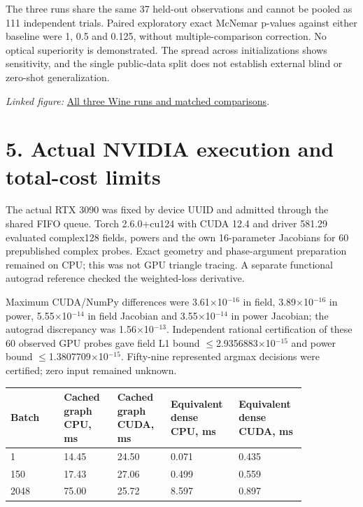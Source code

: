 \documentclass[11pt]{article}
\begin{document}
The three runs share the same 37 held-out observations and cannot be pooled as 111 independent trials. Paired exploratory exact McNemar p-values against either baseline were 1, 0.5 and 0.125, without multiple-comparison correction. No optical superiority is demonstrated. The spread across initializations shows sensitivity, and the single public-data split does not establish external blind or zero-shot generalization.

\noindent\textit{Linked figure: }\href{https://github.com/Agnuxo1/Neuro3D/blob/a6d0fbec5011bdc76abad71edac86519016348f4/Docs/assets/wine-geometry-and-baselines-2026-10-09.png}{All three Wine runs and matched comparisons}.

\section*{5. Actual NVIDIA execution and total-cost limits}

The actual RTX 3090 was fixed by device UUID and admitted through the shared FIFO queue. Torch 2.6.0+cu124 with CUDA 12.4 and driver 581.29 evaluated complex128 fields, powers and the own 16-parameter Jacobians for 60 prepublished complex probes. Exact geometry and phase-argument preparation remained on CPU; this was not GPU triangle tracing. A separate functional autograd reference checked the weighted-loss derivative.

Maximum CUDA/NumPy differences were 3.61$\times$10$^{-16}$ in field, 3.89$\times$10$^{-16}$ in power, 5.55$\times$10$^{-14}$ in field Jacobian and 3.55$\times$10$^{-14}$ in power Jacobian; the autograd discrepancy was 1.56$\times$10$^{-13}$. Independent rational certification of these 60 observed GPU probes gave field L1 bound $\leq$2.9356883$\times$10$^{-15}$ and power bound $\leq$1.3807709$\times$10$^{-15}$. Fifty-nine represented argmax decisions were certified; zero input remained unknown.

\begin{small}\begin{longtable}{@{}p{0.168\linewidth} p{0.168\linewidth} p{0.168\linewidth} p{0.168\linewidth} p{0.168\linewidth}@{}}\toprule
Batch & Cached graph CPU, ms & Cached graph CUDA, ms & Equivalent dense CPU, ms & Equivalent dense CUDA, ms \\
\midrule
1 & 14.45 & 24.50 & 0.071 & 0.435 \\
150 & 17.43 & 27.06 & 0.499 & 0.559 \\
2048 & 75.00 & 25.72 & 8.597 & 0.897 \\
\bottomrule\end{longtable}\end{small}
\end{document}
